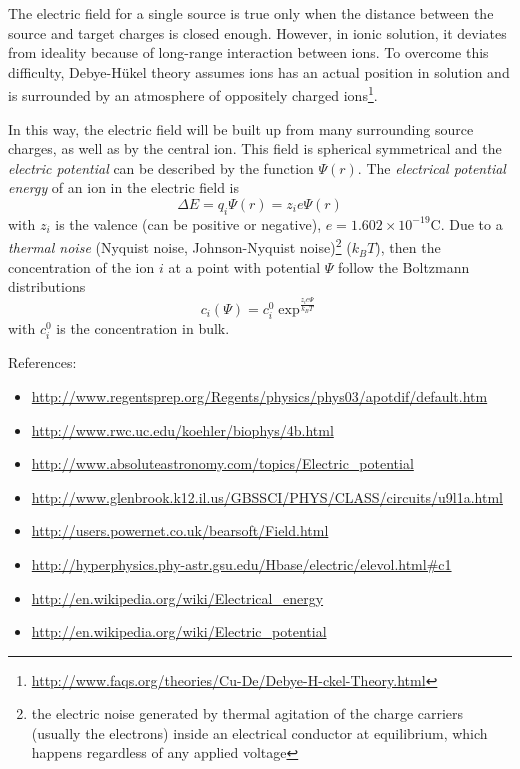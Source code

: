 The electric field for a single source is true only when the distance
between the source and target charges is closed enough. However, in
ionic solution, it deviates from ideality because of long-range
interaction between ions. To overcome this difficulty, Debye-H\"ukel
theory assumes ions has an actual position in solution and is
surrounded by an atmosphere of oppositely charged
ions\footnote{\url{http://www.faqs.org/theories/Cu-De/Debye-H-ckel-Theory.html}}.

In this way, the electric field will be built up from many surrounding
source charges, as well as by the central ion. This field is spherical
symmetrical and the {\it electric potential} can be described by the
function $\Psi(r)$. The {\it electrical potential energy} of an ion in
the electric field is
\begin{equation}
  \label{eq:125}
  \Delta E =  q_i\Psi(r) = z_ie\Psi(r)
\end{equation}
with $z_i$ is the valence (can be positive or negative),
$e=1.602\times 10^{-19}$C. Due to a {\it thermal noise} (Nyquist
noise, Johnson-Nyquist
noise)\footnote{the electric noise generated by thermal agitation of
  the charge carriers (usually the electrons) inside an electrical
  conductor at equilibrium, which happens regardless of any applied
  voltage}
($k_BT$), then the concentration of the ion $i$ at a point with
potential $\Psi$ follow the Boltzmann distributions
\begin{equation}
  \label{eq:87}
  c_i(\Psi) = c_i^0 \exp^{\frac{z_ie\Psi}{k_BT}}
\end{equation}
with $c_i^0$ is the concentration in bulk.


References:
\begin{itemize}
\item
  \url{http://www.regentsprep.org/Regents/physics/phys03/apotdif/default.htm}
\item \url{http://www.rwc.uc.edu/koehler/biophys/4b.html}
\item \url{http://www.absoluteastronomy.com/topics/Electric_potential}
\item
  \url{http://www.glenbrook.k12.il.us/GBSSCI/PHYS/CLASS/circuits/u9l1a.html}
\item \url{http://users.powernet.co.uk/bearsoft/Field.html}
\item
  \url{http://hyperphysics.phy-astr.gsu.edu/Hbase/electric/elevol.html#c1}

\item \url{http://en.wikipedia.org/wiki/Electrical_energy}
\item \url{http://en.wikipedia.org/wiki/Electric_potential}
\end{itemize}



